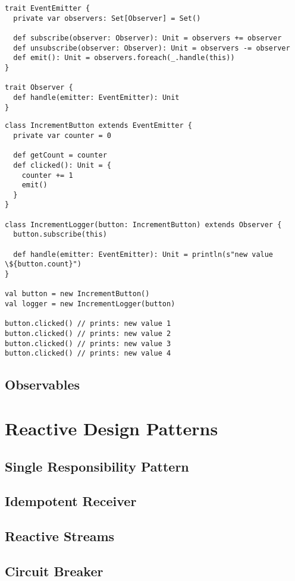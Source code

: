 \begin{lstlisting}[caption={Codebeispiel für das Observer-Pattern.},label={lst:lst5}]
trait EventEmitter {
  private var observers: Set[Observer] = Set()

  def subscribe(observer: Observer): Unit = observers += observer
  def unsubscribe(observer: Observer): Unit = observers -= observer
  def emit(): Unit = observers.foreach(_.handle(this))
}

trait Observer {
  def handle(emitter: EventEmitter): Unit
}
\end{lstlisting}

\pagebreak

\begin{lstlisting}[caption={Codebeispiel für das Observer-Pattern.},label={lst:lst6}]
class IncrementButton extends EventEmitter {
  private var counter = 0

  def getCount = counter
  def clicked(): Unit = {
    counter += 1
    emit()
  }
}

class IncrementLogger(button: IncrementButton) extends Observer {
  button.subscribe(this)

  def handle(emitter: EventEmitter): Unit = println(s"new value \${button.count}")
}

val button = new IncrementButton()
val logger = new IncrementLogger(button)

button.clicked() // prints: new value 1
button.clicked() // prints: new value 2
button.clicked() // prints: new value 3
button.clicked() // prints: new value 4
\end{lstlisting}

\subsection{Observables}

\pagebreak

\section{Reactive Design Patterns}
\subsection{Single Responsibility Pattern}
\subsection{Idempotent Receiver}
\subsection{Reactive Streams}
\subsection{Circuit Breaker}
